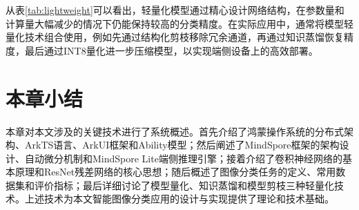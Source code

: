 从表\ref{tab:lightweight}可以看出，轻量化模型通过精心设计网络结构，在参数量和计算量大幅减少的情况下仍能保持较高的分类精度。在实际应用中，通常将模型轻量化技术组合使用，例如先通过结构化剪枝移除冗余通道，再通过知识蒸馏恢复精度，最后通过INT8量化进一步压缩模型，以实现端侧设备上的高效部署。

\section{本章小结}

本章对本文涉及的关键技术进行了系统概述。首先介绍了鸿蒙操作系统的分布式架构、ArkTS语言、ArkUI框架和Ability模型；然后阐述了MindSpore框架的架构设计、自动微分机制和MindSpore Lite端侧推理引擎；接着介绍了卷积神经网络的基本原理和ResNet残差网络的核心思想；随后概述了图像分类任务的定义、常用数据集和评价指标；最后详细讨论了模型量化、知识蒸馏和模型剪枝三种轻量化技术。上述技术为本文智能图像分类应用的设计与实现提供了理论和技术基础。
